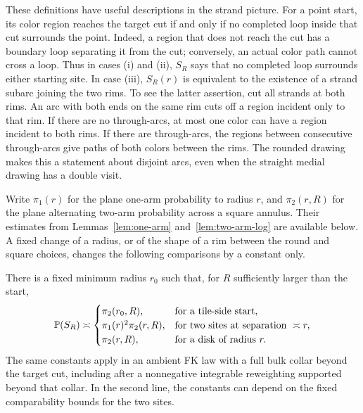 These definitions have useful descriptions in the strand picture.
For a point start, its color region reaches the target cut if and only
if no completed loop inside that cut surrounds the point.  Indeed, a
region that does not reach the cut has a boundary loop separating it
from the cut; conversely, an actual color path cannot cross a loop.
Thus in cases \textup{(i)} and \textup{(ii)}, $S_R$ says that no
completed loop surrounds either starting site.  In case \textup{(iii)},
$S_R(r)$ is equivalent to the existence of a strand subarc joining the
two rims.  To see the latter assertion, cut all strands at both rims.
An arc with both ends on the same rim cuts off a region incident only
to that rim.  If there are no through-arcs, at most one color can have
a region incident to both rims.  If there are through-arcs, the regions
between consecutive through-arcs give paths of both colors between
the rims.  The rounded drawing makes this a statement about disjoint
arcs, even when the straight medial drawing has a double visit.

Write $\pi_1(r)$ for the plane one-arm probability to radius $r$, and
$\pi_2(r,R)$ for the plane alternating two-arm probability across a
square annulus.  Their estimates from Lemmas~\ref{lem:one-arm}
and~\ref{lem:two-arm-log} are available below.  A fixed change of a
radius, or of the shape of a rim between the round and square choices,
changes the following comparisons by a constant only.

\begin{lemma}
\label{lem:start-probabilities}
There is a fixed minimum radius $r_0$ such that, for $R$ sufficiently
larger than the start,
\begin{equation}\label{eq:start-probabilities}
 \mathbb P(S_R)\asymp
 \begin{cases}
   \pi_2(r_0,R),&\text{for a tile-side start},\\
   \pi_1(r)^2\pi_2(r,R),&\text{for two sites at separation }\asymp r,\\
   \pi_2(r,R),&\text{for a disk of radius }r.
 \end{cases}
\end{equation}
The same constants apply in an ambient FK law with a full bulk collar
beyond the target cut, including after a nonnegative integrable
reweighting supported beyond that collar.  In the second line, the
constants can depend on the fixed comparability bounds for the two
sites.
\end{lemma}

